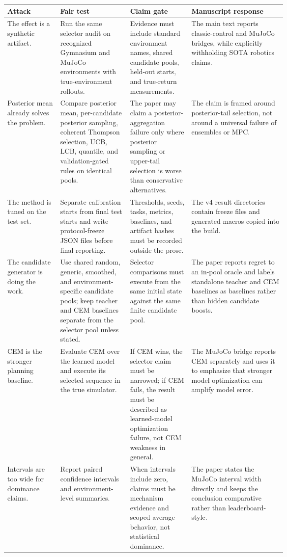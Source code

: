 \documentclass{article}
\begin{document}
\begin{center}
\small
\begin{tabularx}{\linewidth}{p{0.19\linewidth}p{0.25\linewidth}p{0.22\linewidth}X}
\toprule
Attack & Fair test & Claim gate & Manuscript response \\
\midrule
The effect is a synthetic artifact. &
Run the same selector audit on recognized Gymnasium and MuJoCo environments
with true-environment rollouts. &
Evidence must include standard environment names, shared candidate pools,
held-out starts, and true-return measurements. &
The main text reports classic-control and MuJoCo bridges, while explicitly
withholding SOTA robotics claims. \\
Posterior mean already solves the problem. &
Compare posterior mean, per-candidate posterior sampling, coherent Thompson
selection, UCB, LCB, quantile, and validation-gated rules on identical pools. &
The paper may claim a posterior-aggregation failure only where posterior
sampling or upper-tail selection is worse than conservative alternatives. &
The claim is framed around posterior-tail selection, not around a universal
failure of ensembles or MPC. \\
The method is tuned on the test set. &
Separate calibration starts from final test starts and write protocol-freeze
JSON files before final reporting. &
Thresholds, seeds, tasks, metrics, baselines, and artifact hashes must be
recorded outside the prose. &
The v4 result directories contain freeze files and generated macros copied
into the build. \\
The candidate generator is doing the work. &
Use shared random, generic, smoothed, and environment-specific candidate pools;
keep teacher and CEM baselines separate from the selector pool unless stated. &
Selector comparisons must execute from the same initial state against the same
finite candidate pool. &
The paper reports regret to an in-pool oracle and labels standalone teacher
and CEM baselines as baselines rather than hidden candidate boosts. \\
CEM is the stronger planning baseline. &
Evaluate CEM over the learned model and execute its selected sequence in the
true simulator. &
If CEM wins, the selector claim must be narrowed; if CEM fails, the result
must be described as learned-model optimization failure, not CEM weakness in
general. &
The MuJoCo bridge reports CEM separately and uses it to emphasize that stronger
model optimization can amplify model error. \\
Intervals are too wide for dominance claims. &
Report paired confidence intervals and environment-level summaries. &
When intervals include zero, claims must be mechanism evidence and scoped
average behavior, not statistical dominance. &
The paper states the MuJoCo interval width directly and keeps the conclusion
comparative rather than leaderboard-style. \\
\bottomrule
\end{tabularx}
\end{center}
\end{document}
